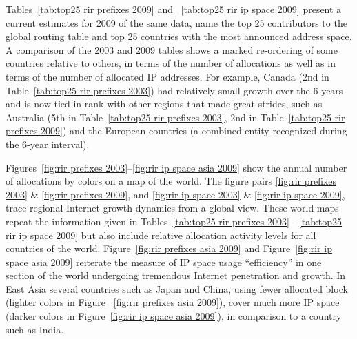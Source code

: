 Tables~\ref{tab:top25 rir prefixes 2009} and ~\ref{tab:top25 rir ip space
2009} present a current estimates for 2009 of the same data, name the 
top 25 contributors to the global routing table and top 25 countries with 
the most announced address space. A comparison of the 2003 and 2009 tables 
shows a marked re-ordering of some countries relative to others, in terms 
of the number of allocations as well as in terms of the number of allocated 
IP addresses. For example, Canada (2nd in 
Table~\ref{tab:top25 rir prefixes 2003}) had relatively small growth over 
the 6 years and is now tied in rank with other regions that made great strides, 
such as Australia (5th in Table~\ref{tab:top25 rir prefixes 2003}, 
2nd in Table~\ref{tab:top25 rir prefixes 2009}) and the European countries 
(a combined entity recognized during the 6-year interval).

Figures~\ref{fig:rir prefixes 2003}--\ref{fig:rir ip space asia 2009} show the
annual number of allocations by colors on a map of the world. The figure pairs 
\ref{fig:rir prefixes 2003} \& \ref{fig:rir prefixes 2009}, and 
\ref{fig:rir ip space 2003} \& \ref{fig:rir ip space 2009}, trace regional Internet 
growth dynamics from a global view.  These world maps repeat the information given 
in Tables~\ref{tab:top25 rir prefixes 2003}--~\ref{tab:top25 rir ip space
2009} but also include relative allocation activity levels for all countries of 
the world.  Figure~\ref{fig:rir prefixes asia 2009} and 
Figure~\ref{fig:rir ip space asia 2009} reiterate the measure of IP space usage
``efficiency'' in one section of the world undergoing tremendous Internet penetration 
and growth.  In East Asia several countries such as Japan and China, using fewer allocated 
block (lighter colors in Figure ~\ref{fig:rir prefixes asia 2009}), 
cover much more IP space (darker colors in Figure~\ref{fig:rir ip space asia 2009}), 
in comparison to a country such as India.

